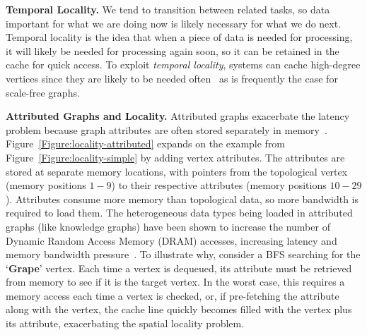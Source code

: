 

\textbf{Temporal Locality.} 
We tend to transition between related tasks, so data important for what we are doing now is likely necessary for what we do next. 
Temporal locality is the idea that when a piece of data is needed for processing, it will likely be needed for processing again soon, so it can be retained in the cache for quick access.
To exploit \textit{temporal locality}, systems can cache high-degree vertices since they are likely to be needed often~\cite{Beamer2015} as is frequently the case for scale-free graphs.



\textbf{Attributed Graphs and Locality.}
Attributed graphs exacerbate the latency problem because graph attributes are often stored separately in memory~\cite{Buluc2013}. 
Figure~\ref{Figure:locality-attributed} expands on the example from Figure~\ref{Figure:locality-simple} by adding vertex attributes. 
The attributes are stored at separate memory locations, with pointers from the topological vertex (memory positions $1-9$) to their respective attributes (memory positions $10-29$). 
Attributes consume more memory than topological data, so more bandwidth is required to load them.
The heterogeneous data types being loaded in attributed graphs (like knowledge graphs) have been shown to increase the number of Dynamic Random Access Memory (DRAM) accesses, increasing latency and memory bandwidth pressure~\cite{Basak2019}.
To illustrate why, consider a BFS searching for the `\textbf{Grape}' vertex. 
Each time a vertex is dequeued, its attribute must be retrieved from memory to see if it is the target vertex. 
In the worst case, this requires a memory access each time a vertex is checked, or, if pre-fetching the attribute along with the vertex, the cache line quickly becomes filled with the vertex plus its attribute, exacerbating the spatial locality problem.

